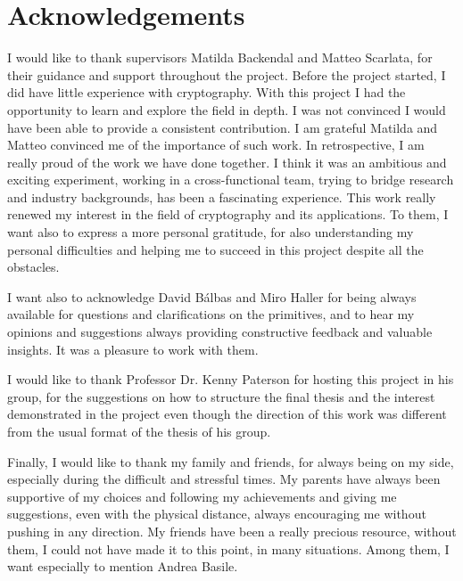 \chapter*{Acknowledgements}

I would like to thank supervisors Matilda Backendal and Matteo Scarlata,
for their guidance and support throughout the project.
Before the project started, I did have little experience with
cryptography. With this project I had the opportunity to
learn and explore the field in depth. 
I was not convinced I would have been able to provide
a consistent contribution. 
I am grateful Matilda and Matteo convinced me of the importance of such work.
In retrospective, I am really
proud of the work we have done together.
I think it was an ambitious and exciting experiment,
working in a cross-functional team, trying to bridge
research and industry backgrounds, 
has been a fascinating experience.
This work really renewed my interest in the field of cryptography
and its applications.
To them, I want also to express a more personal gratitude,
for also understanding my personal difficulties and
helping me to succeed in this project despite all the obstacles.

I want also to acknowledge David B{\'a}lbas and Miro Haller for 
being always available for questions and clarifications on the primitives,
and to hear my opinions and suggestions always providing
constructive feedback and valuable insights. It was a pleasure
to work with them.

I would like to thank Professor Dr. Kenny Paterson
for hosting this project in his group, for the suggestions
on how to structure the final thesis and the interest
demonstrated in the project even though the direction
of this work was different from the usual format of the thesis
of his group.

Finally, I would like to thank my family and friends, for always
being on my side, especially during the difficult and stressful
times. My parents have always been supportive of my choices and
following my achievements and giving me suggestions, 
even with the physical distance, 
always encouraging me without pushing in any direction. 
My friends have been
a really precious resource, without them, I could not have
made it to this point, in many situations. Among them, I want
especially to mention Andrea Basile.
